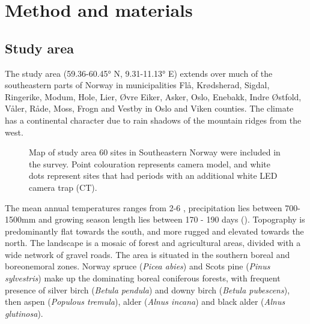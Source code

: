 \chapter{Method and materials}


\section{Study area} %


The study area (59.36-60.45° N, 9.31-11.13° E) extends over much of the southeastern parts of Norway in municipalities Flå, Krødsherad, Sigdal, Ringerike, Modum, Hole, Lier, Øvre Eiker, Asker, Oslo, Enebakk, Indre Østfold, Våler, Råde, Moss, Frogn and Vestby in Oslo and Viken counties. 
The climate has a continental character due to rain shadows of the mountain ridges from the west. 


\begin{figure}
\centering
	\caption[Map of study area]
	{Map of study area %
	60 sites in Southeastern Norway were included in the survey. Point colouration represents camera model, and white dots represent sites that had periods with an additional white LED camera trap (CT).}
	\label{fig:map}
\end{figure}

The mean annual temperatures ranges from 2-6 \celsius , precipitation lies between 700-1500mm and growing season length lies between 170 - 190 days (\cite{Moen1999}).
Topography is predominantly flat towards the south, and more rugged and elevated towards the north. The landscape is a mosaic of forest and agricultural areas, divided with a wide network of gravel roads.
The area is situated in the southern boreal and boreonemoral zones. %
Norway spruce (\textit{Picea abies}) and Scots pine (\textit{Pinus sylvestris}) make up the dominating boreal coniferous forests, with frequent presence of silver birch (\textit{Betula pendula}) and downy birch (\textit{Betula pubescens}), then aspen (\textit{Populous tremula}), alder (\textit{Alnus incana}) and black alder (\textit{Alnus glutinosa}).



